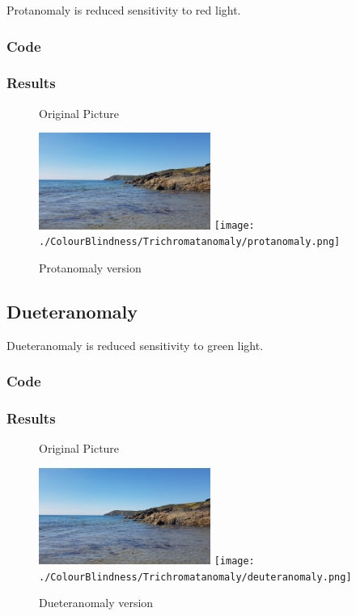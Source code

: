 \documentclass{Report}
\begin{document}
Protanomaly is reduced sensitivity to red light.\autocite{Types}
\subsubsection{Code}


\newpage

\subsubsection{Results}
\begin{figure}[h!]
  \centering
  \caption{Original Picture}
  \includegraphics[width=0.5\textwidth]{Lizard}
  \centering
  \texttt{[image: ./ColourBlindness/Trichromatanomaly/protanomaly.png]}
  \caption{Protanomaly version}
\end{figure}

\newpage

\subsection{Dueteranomaly}

Dueteranomaly is reduced sensitivity to green light. \autocites{Types}
\subsubsection{Code}


\newpage

\subsubsection{Results}
\begin{figure}[h!]
  \centering
  \caption{Original Picture}
  \includegraphics[width=0.5\textwidth]{Lizard}
  \centering
  \texttt{[image: ./ColourBlindness/Trichromatanomaly/deuteranomaly.png]}
  \caption{Dueteranomaly version}
\end{figure}
\end{document}

